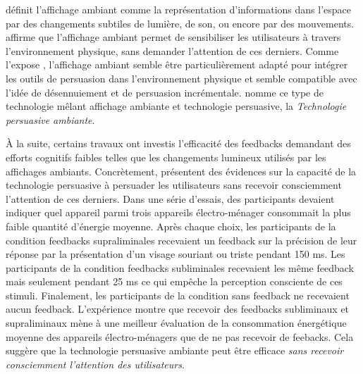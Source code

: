 \documentclass[10pt,a5paper,twoside]{article}
\begin{document}
\citet{ishii1997tangible} définit l'affichage ambiant comme la
représentation d'informations dans l'espace par des changements subtiles
de lumière, de son, ou encore par des mouvements.
\citet{wisneski1998ambient} affirme que l'affichage ambiant permet de
sensibiliser les utilisateurs à travers l'environnement physique, sans
demander l'attention de ces derniers. Comme l'expose
\citet{davis2008towards}, l'affichage ambiant semble être
particulièrement adapté pour intégrer les outils de persuasion dans
l'environnement physique et semble compatible avec l'idée de
désennuiement et de persuasion incrémentale. \citet{davis2008towards}
nomme ce type de technologie mêlant affichage ambiante et technologie
persuasive, la \emph{Technologie persuasive ambiante}.

À la suite, certains travaux ont investis l'efficacité des feedbacks
demandant des efforts cognitifs faibles telles que les changements
lumineux utilisés par les affichages ambiants. Concrètement,
\citet{ham2009can} présentent des évidences sur la capacité de la
technologie persuasive à persuader les utilisateurs sans recevoir
consciemment l'attention de ces derniers. Dans une série d'essais, des
participants devaient indiquer quel appareil parmi trois appareils
électro-ménager consommait la plus faible quantité d'énergie moyenne.
Après chaque choix, les participants de la condition feedbacks
supraliminales recevaient un feedback sur la précision de leur réponse
par la présentation d'un visage souriant ou triste pendant 150 ms. Les
participants de la condition feedbacks subliminales recevaient les même
feedback mais seulement pendant 25 ms ce qui empêche la perception
consciente de ces stimuli. Finalement, les participants de la condition
sans feedback ne recevaient aucun feedback. L'expérience montre que
recevoir des feedbacks subliminaux et supraliminaux mène à une meilleur
évaluation de la consommation énergétique moyenne des appareils
électro-ménagers que de ne pas recevoir de feebacks. Cela suggère que la
technologie persuasive ambiante peut être efficace \emph{sans recevoir
consciemment l'attention des utilisateurs}.
\end{document}
